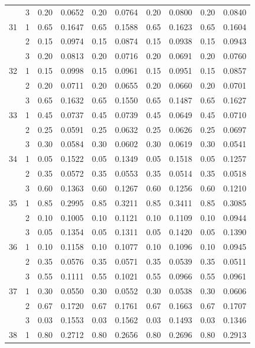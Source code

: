 \begin{longtable}{llcccccccc}
   & 3 & 0.20 & 0.0652 & 0.20 & 0.0764 & 0.20 & 0.0800 & 0.20 & 0.0840 \\ 
  31 & 1 & 0.65 & 0.1647 & 0.65 & 0.1588 & 0.65 & 0.1623 & 0.65 & 0.1604 \\ 
   & 2 & 0.15 & 0.0974 & 0.15 & 0.0874 & 0.15 & 0.0938 & 0.15 & 0.0943 \\ 
   & 3 & 0.20 & 0.0813 & 0.20 & 0.0716 & 0.20 & 0.0691 & 0.20 & 0.0760 \\ 
  32 & 1 & 0.15 & 0.0998 & 0.15 & 0.0961 & 0.15 & 0.0951 & 0.15 & 0.0857 \\ 
   & 2 & 0.20 & 0.0711 & 0.20 & 0.0655 & 0.20 & 0.0660 & 0.20 & 0.0701 \\ 
   & 3 & 0.65 & 0.1632 & 0.65 & 0.1550 & 0.65 & 0.1487 & 0.65 & 0.1627 \\ 
  33 & 1 & 0.45 & 0.0737 & 0.45 & 0.0739 & 0.45 & 0.0649 & 0.45 & 0.0710 \\ 
   & 2 & 0.25 & 0.0591 & 0.25 & 0.0632 & 0.25 & 0.0626 & 0.25 & 0.0697 \\ 
   & 3 & 0.30 & 0.0584 & 0.30 & 0.0602 & 0.30 & 0.0619 & 0.30 & 0.0541 \\ 
  34 & 1 & 0.05 & 0.1522 & 0.05 & 0.1349 & 0.05 & 0.1518 & 0.05 & 0.1257 \\ 
   & 2 & 0.35 & 0.0572 & 0.35 & 0.0553 & 0.35 & 0.0514 & 0.35 & 0.0518 \\ 
   & 3 & 0.60 & 0.1363 & 0.60 & 0.1267 & 0.60 & 0.1256 & 0.60 & 0.1210 \\ 
  35 & 1 & 0.85 & 0.2995 & 0.85 & 0.3211 & 0.85 & 0.3411 & 0.85 & 0.3085 \\ 
   & 2 & 0.10 & 0.1005 & 0.10 & 0.1121 & 0.10 & 0.1109 & 0.10 & 0.0944 \\ 
   & 3 & 0.05 & 0.1354 & 0.05 & 0.1311 & 0.05 & 0.1420 & 0.05 & 0.1390 \\ 
  36 & 1 & 0.10 & 0.1158 & 0.10 & 0.1077 & 0.10 & 0.1096 & 0.10 & 0.0945 \\ 
   & 2 & 0.35 & 0.0576 & 0.35 & 0.0571 & 0.35 & 0.0539 & 0.35 & 0.0511 \\ 
   & 3 & 0.55 & 0.1111 & 0.55 & 0.1021 & 0.55 & 0.0966 & 0.55 & 0.0961 \\ 
  37 & 1 & 0.30 & 0.0550 & 0.30 & 0.0552 & 0.30 & 0.0538 & 0.30 & 0.0606 \\ 
   & 2 & 0.67 & 0.1720 & 0.67 & 0.1761 & 0.67 & 0.1663 & 0.67 & 0.1707 \\ 
   & 3 & 0.03 & 0.1553 & 0.03 & 0.1562 & 0.03 & 0.1493 & 0.03 & 0.1346 \\ 
  38 & 1 & 0.80 & 0.2712 & 0.80 & 0.2656 & 0.80 & 0.2696 & 0.80 & 0.2913 \\ 

\end{longtable}
